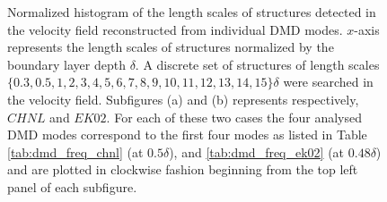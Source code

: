 \begin{figure}[htb]
\begin{minipage}{\textwidth}
\begin{picture}
	\end{picture}
	\end{minipage}
\caption{Normalized histogram of the length scales of structures detected in the velocity field reconstructed from individual DMD modes. $x$-axis represents the length scales of structures normalized by the boundary layer depth $\delta$. A discrete set of structures of length scales $ \{ 0.3, 0.5, 1, 2 , 3, 4, 5, 6, 7, 8, 9, 10, 11, 12, 13, 14, 15 \} \delta$ were searched in the velocity field. Subfigures (a) and (b) represents respectively, $CHNL$ and  $EK02$. For each of these two cases the four analysed DMD modes correspond to the first four modes as listed in Table \ref{tab:dmd_freq_chnl} (at $0.5\delta$), and \ref{tab:dmd_freq_ek02} (at $0.48\delta$) and are plotted in clockwise fashion beginning from the top left panel of each subfigure.}	
\label{fig:dmd_length_scale_dist}
\end{figure}
